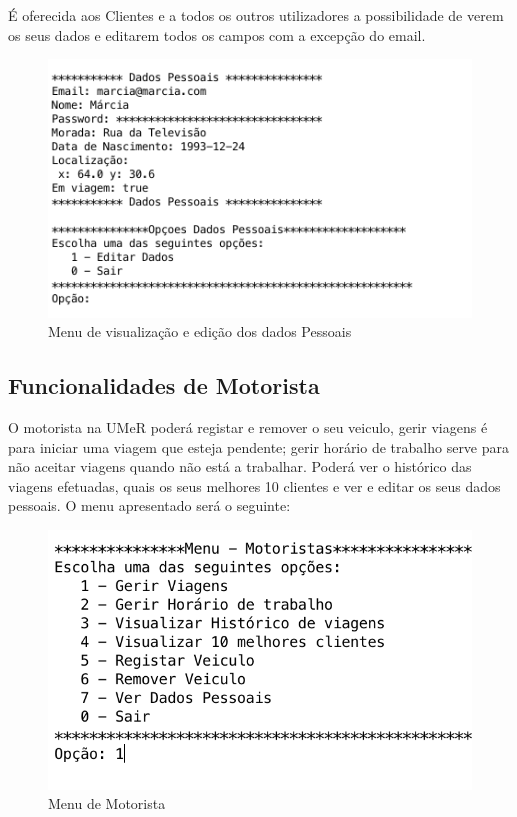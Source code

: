 \begin{enumerate}
É oferecida aos Clientes e a todos os outros utilizadores a possibilidade de verem os seus dados e editarem todos os campos com a excepção do email. 
\begin{figure}[htpb]
	\centering
	\includegraphics[scale=0.6]{imagem/verDadosPessoais}
	\caption{Menu de visualização e edição dos dados Pessoais }
	\label{p3:fig:p3_verDadosPessoais}
\end{figure}

\end{enumerate}


\newpage
\subsection{Funcionalidades de Motorista}
O motorista na UMeR poderá registar e remover o seu veiculo, gerir viagens é para iniciar uma viagem que esteja pendente; gerir horário de trabalho serve para não aceitar viagens quando não está a trabalhar. Poderá ver o histórico das viagens efetuadas, quais os seus melhores 10 clientes e ver e editar os seus dados pessoais. O menu apresentado será o seguinte: 
\begin{figure}[htpb]
	\centering
	\includegraphics[scale=0.6]{imagem/menuMotorista}
	\caption{Menu de Motorista }
	\label{p3:fig:p3_menuMotorista}
\end{figure}

